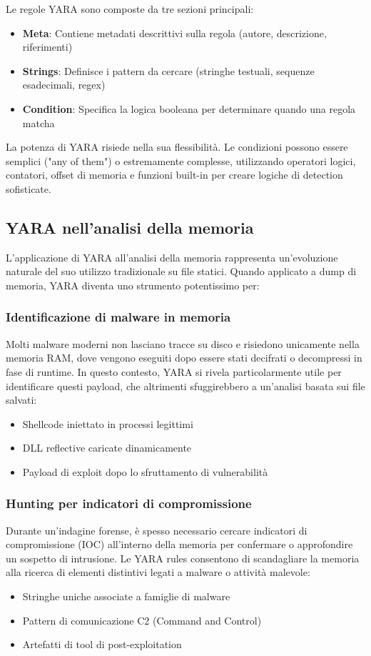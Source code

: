Le regole YARA sono composte da tre sezioni principali:
\begin{itemize}
    \item \textbf{Meta}: Contiene metadati descrittivi sulla regola (autore, descrizione, riferimenti)
    \item \textbf{Strings}: Definisce i pattern da cercare (stringhe testuali, sequenze esadecimali, regex)
    \item \textbf{Condition}: Specifica la logica booleana per determinare quando una regola matcha
\end{itemize}

La potenza di YARA risiede nella sua flessibilità. Le condizioni possono essere semplici ("any of them") o estremamente complesse, utilizzando operatori logici, contatori, offset di memoria e funzioni built-in per creare logiche di detection sofisticate.

\subsection{YARA nell'analisi della memoria}

L'applicazione di YARA all'analisi della memoria rappresenta un'evoluzione naturale del suo utilizzo tradizionale su file statici. Quando applicato a dump di memoria, YARA diventa uno strumento potentissimo per:

\subsubsection{Identificazione di malware in memoria}
Molti malware moderni non lasciano tracce su disco e risiedono unicamente nella memoria RAM, dove vengono eseguiti dopo essere stati decifrati o decompressi in fase di runtime. In questo contesto, YARA si rivela particolarmente utile per identificare questi payload, che altrimenti sfuggirebbero a un'analisi basata sui file salvati:
\begin{itemize}
  \item Shellcode iniettato in processi legittimi
  \item DLL reflective caricate dinamicamente
  \item Payload di exploit dopo lo sfruttamento di vulnerabilità
\end{itemize}

\subsubsection{Hunting per indicatori di compromissione}
Durante un'indagine forense, è spesso necessario cercare indicatori di compromissione (IOC) all'interno della memoria per confermare o approfondire un sospetto di intrusione. Le YARA rules consentono di scandagliare la memoria alla ricerca di elementi distintivi legati a malware o attività malevole:
\begin{itemize}
  \item Stringhe uniche associate a famiglie di malware
  \item Pattern di comunicazione C2 (Command and Control)
  \item Artefatti di tool di post-exploitation
\end{itemize}

